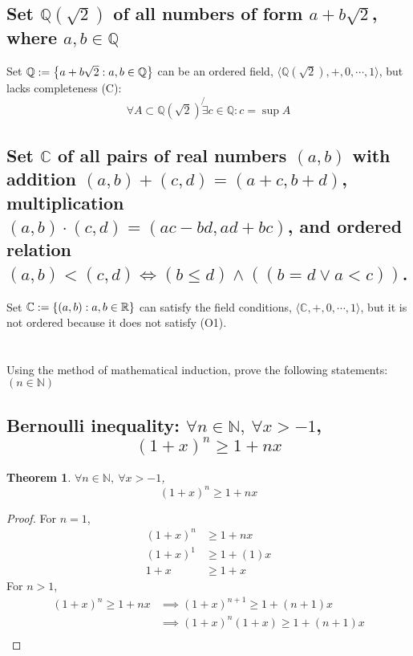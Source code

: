 \documentclass[]{article}
\newcommand{\R}{\mathbb{R}}
\newcommand{\C}{\mathbb{C}}
\newcommand{\N}{\mathbb{N}}
\newcommand{\Q}{\mathbb{Q}}
\newtheorem{theorem}{Theorem}
\begin{document}
\subsection{Set $\Q(\sqrt{2})$ of all numbers of form $a + b\sqrt{2}$, where $a,b\in\Q$}
Set $\Q := \qty{a + b \sqrt{2} : a, b \in \Q}$ can be an ordered field, 
$\langle \Q(\sqrt{2}), +, 0, \cdots, 1\rangle$, but lacks completeness (C):
$$\forall A \subset \Q(\sqrt{2}) \not{\exists} c \in \Q : c = \sup A$$

\subsection{Set $\C$ of all pairs of real numbers $(a,b)$ 
    with addition ${(a,b) + (c,d) = (a+c,b+d)}$, 
    multiplication $(a,b)\cdot(c,d) = (ac-bd,ad+bc)$, 
    and ordered relation $(a,b)<(c,d)\iff(b \leq d)\land((b=d \lor a<c))$.
}
Set $\C := \qty{(a,b) : a,b \in \R}$ can satisfy the field conditions, 
$\langle \C, +, 0, \cdots, 1\rangle$,
but it is not ordered because it does not satisfy (O1).

\newpage
\section{}
Using the method of mathematical induction, 
prove the following statements: $(n \in \N)$

\subsection{Bernoulli inequality: $\forall n\in\N, \ \forall x > -1$,
$$(1+x)^n \geq 1 + nx$$
}

\begin{theorem}
    $\forall n\in\N, \ \forall x > -1$, $$(1+x)^n \geq 1 + nx$$
\end{theorem}

\begin{proof}
    For $n=1$,
    \begin{align*}
        (1+x)^n &\geq 1 + nx\\
        (1+x)^1 &\geq 1 + (1)x\\
        1+x &\geq 1 + x
    \end{align*}
    For $n > 1$,
    \begin{align*}
        (1+x)^n \geq 1 + nx 
            &\implies (1+x)^{n+1} \geq 1 + (n+1)x\\
            &\implies (1+x)^n (1+x) \geq 1 + (n+1)x\\
    \end{align*}
\end{proof}
\end{document}
